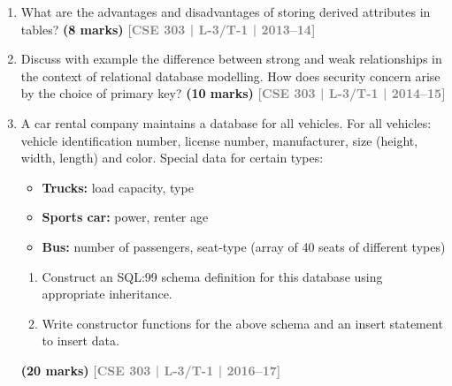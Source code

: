 \documentclass[12pt,a3paper]{article}
\newcommand{\yr}[1]{\hfill\textcolor{gray}{\small\textbf{[#1]}}}
\newcommand{\mk}[1]{\textcolor{orange!70!black}{\small\textbf{(#1 marks)}}}
\begin{document}
\begin{enumerate}
\begin{center}
\end{center}

\mk{6} \yr{CSE 303 | L-3/T-1 | 2015--16}

\item What are the advantages and disadvantages of storing derived attributes in tables?
\mk{8} \yr{CSE 303 | L-3/T-1 | 2013--14}

\item Discuss with example the difference between strong and weak relationships in the context of relational database modelling. How does security concern arise by the choice of primary key?
\mk{10} \yr{CSE 303 | L-3/T-1 | 2014--15}

\item A car rental company maintains a database for all vehicles. For all vehicles: vehicle identification number, license number, manufacturer, size (height, width, length) and color. Special data for certain types:
\begin{itemize}[leftmargin=1.5em,itemsep=1pt]
  \item \textbf{Trucks:} load capacity, type
  \item \textbf{Sports car:} power, renter age
  \item \textbf{Bus:} number of passengers, seat-type (array of 40 seats of different types)
\end{itemize}
\begin{enumerate}
  \item Construct an SQL:99 schema definition for this database using appropriate inheritance.
  \item Write constructor functions for the above schema and an insert statement to insert data.
\end{enumerate}
\mk{20} \yr{CSE 303 | L-3/T-1 | 2016--17}


\end{enumerate}
\end{document}
